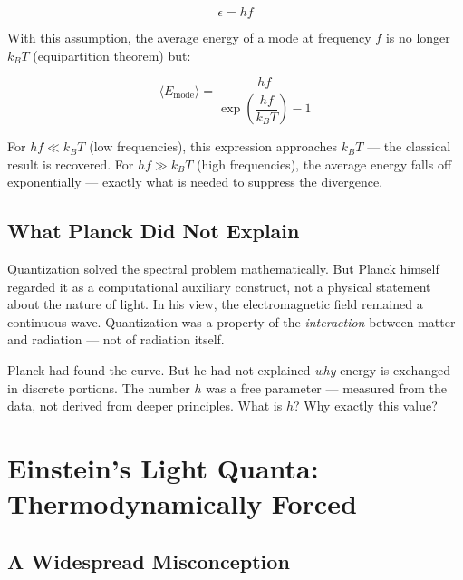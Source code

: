 \begin{equation}
    \epsilon = hf
    \label{eq:planck_quantum}
\end{equation}

With this assumption, the average energy of a mode at frequency $f$ is no longer 
$k_BT$ (equipartition theorem) but:

\begin{equation}
    \langle E_{\text{mode}} \rangle = \frac{hf}{\exp\!\left(\dfrac{hf}{k_BT}\right) - 1}
    \label{eq:planck_mean_energy}
\end{equation}

For $hf \ll k_BT$ (low frequencies), this expression approaches $k_BT$ — the 
classical result is recovered. For $hf \gg k_BT$ (high frequencies), the average 
energy falls off exponentially — exactly what is needed to suppress the divergence.

\subsection{What Planck Did Not Explain}

Quantization solved the spectral problem mathematically. But Planck himself regarded 
it as a computational auxiliary construct, not a physical statement about the nature 
of light. In his view, the electromagnetic field remained a continuous wave. 
Quantization was a property of the \emph{interaction} between matter and radiation — 
not of radiation itself.

\begin{keyresult}
    Planck had found the curve. But he had not explained \emph{why} energy is 
    exchanged in discrete portions. The number $h$ was a free parameter — measured 
    from the data, not derived from deeper principles. What is $h$? Why exactly 
    this value?
\end{keyresult}

\clearpage

\section{Einstein's Light Quanta: Thermodynamically Forced}
\label{sec:einstein}

\subsection{A Widespread Misconception}


